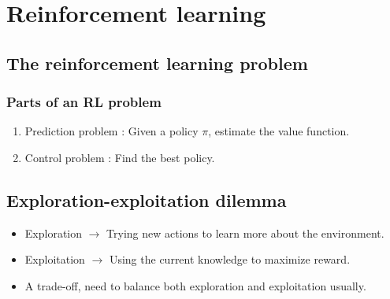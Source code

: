 \section{Reinforcement learning}

\subsection{The reinforcement learning problem}

\subsubsection{Parts of an RL problem}

\begin{enumerate}
      \item
            Prediction problem :
            Given a policy \( \pi \), estimate the value function.
      \item
            Control problem :
            Find the best policy.
\end{enumerate}

\subsection{Exploration-exploitation dilemma}

\begin{itemize}
      \item
            Exploration \( \to \) Trying new actions to learn more about the environment.
      \item
            Exploitation \( \to \) Using the current knowledge to maximize reward.
      \item
            A trade-off, need to balance both exploration and exploitation usually.
\end{itemize}
